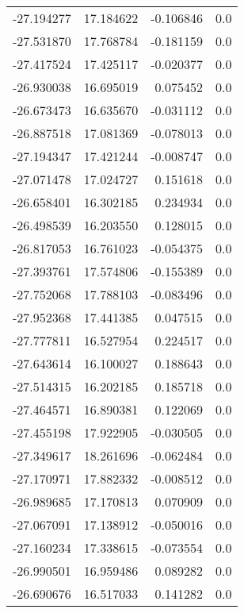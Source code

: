 \begin{tabular}{rrrr}
      -27.194277 &        17.184622 &   -0.106846 &   0.0 \\
      -27.531870 &        17.768784 &   -0.181159 &   0.0 \\
      -27.417524 &        17.425117 &   -0.020377 &   0.0 \\
      -26.930038 &        16.695019 &    0.075452 &   0.0 \\
      -26.673473 &        16.635670 &   -0.031112 &   0.0 \\
      -26.887518 &        17.081369 &   -0.078013 &   0.0 \\
      -27.194347 &        17.421244 &   -0.008747 &   0.0 \\
      -27.071478 &        17.024727 &    0.151618 &   0.0 \\
      -26.658401 &        16.302185 &    0.234934 &   0.0 \\
      -26.498539 &        16.203550 &    0.128015 &   0.0 \\
      -26.817053 &        16.761023 &   -0.054375 &   0.0 \\
      -27.393761 &        17.574806 &   -0.155389 &   0.0 \\
      -27.752068 &        17.788103 &   -0.083496 &   0.0 \\
      -27.952368 &        17.441385 &    0.047515 &   0.0 \\
      -27.777811 &        16.527954 &    0.224517 &   0.0 \\
      -27.643614 &        16.100027 &    0.188643 &   0.0 \\
      -27.514315 &        16.202185 &    0.185718 &   0.0 \\
      -27.464571 &        16.890381 &    0.122069 &   0.0 \\
      -27.455198 &        17.922905 &   -0.030505 &   0.0 \\
      -27.349617 &        18.261696 &   -0.062484 &   0.0 \\
      -27.170971 &        17.882332 &   -0.008512 &   0.0 \\
      -26.989685 &        17.170813 &    0.070909 &   0.0 \\
      -27.067091 &        17.138912 &   -0.050016 &   0.0 \\
      -27.160234 &        17.338615 &   -0.073554 &   0.0 \\
      -26.990501 &        16.959486 &    0.089282 &   0.0 \\
      -26.690676 &        16.517033 &    0.141282 &   0.0 \\

\end{tabular}

